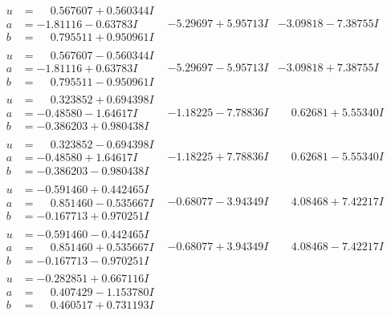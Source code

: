 \documentclass[1p]{elsarticle_modified}
\theoremstyle{definition}
\begin{document}
$$\begin{array}{c|c|c}
\begin{aligned}
u &= \phantom{-}0.567607 + 0.560344 I \\
a &= -1.81116 - 0.63783 I \\
b &= \phantom{-}0.795511 + 0.950961 I\end{aligned}
 & -5.29697 + 5.95713 I & -3.09818 - 7.38755 I \\ \hline\begin{aligned}
u &= \phantom{-}0.567607 - 0.560344 I \\
a &= -1.81116 + 0.63783 I \\
b &= \phantom{-}0.795511 - 0.950961 I\end{aligned}
 & -5.29697 - 5.95713 I & -3.09818 + 7.38755 I \\ \hline\begin{aligned}
u &= \phantom{-}0.323852 + 0.694398 I \\
a &= -0.48580 - 1.64617 I \\
b &= -0.386203 + 0.980438 I\end{aligned}
 & -1.18225 - 7.78836 I & \phantom{-}0.62681 + 5.55340 I \\ \hline\begin{aligned}
u &= \phantom{-}0.323852 - 0.694398 I \\
a &= -0.48580 + 1.64617 I \\
b &= -0.386203 - 0.980438 I\end{aligned}
 & -1.18225 + 7.78836 I & \phantom{-}0.62681 - 5.55340 I \\ \hline\begin{aligned}
u &= -0.591460 + 0.442465 I \\
a &= \phantom{-}0.851460 - 0.535667 I \\
b &= -0.167713 + 0.970251 I\end{aligned}
 & -0.68077 - 3.94349 I & \phantom{-}4.08468 + 7.42217 I \\ \hline\begin{aligned}
u &= -0.591460 - 0.442465 I \\
a &= \phantom{-}0.851460 + 0.535667 I \\
b &= -0.167713 - 0.970251 I\end{aligned}
 & -0.68077 + 3.94349 I & \phantom{-}4.08468 - 7.42217 I \\ \hline\begin{aligned}
u &= -0.282851 + 0.667116 I \\
a &= \phantom{-}0.407429 - 1.153780 I \\
b &= \phantom{-}0.460517 + 0.731193 I\end{aligned}

\end{array}$$
\end{document}
